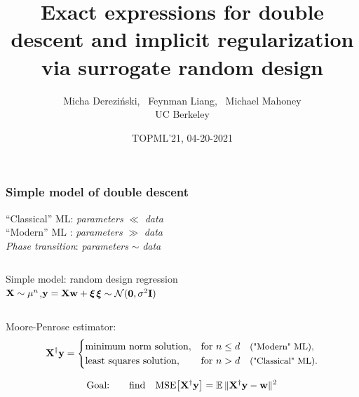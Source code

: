 \documentclass[8pt]{beamer}
\title[Surrogate design]{
  Exact expressions for double descent and implicit regularization via surrogate random design
}
\date{TOPML'21, 04-20-2021}
\author[]{Micha{\polishl } Derezi\'{n}ski, \ Feynman Liang,
  \ Michael Mahoney\\UC Berkeley}
\begin{document}
\begin{frame}
  \maketitle
\end{frame}

\begin{frame}
  \frametitle{Simple model of double descent}

  {\centering
    ``Classical'' ML: \qquad\textit{parameters} $\ll$ \textit{data}\quad~\\
    ``Modern'' ML
    : \qquad\textit{parameters} $\gg$ \textit{data}\quad~\\
    \textit{Phase transition}: \qquad\textit{parameters} $\sim$ \textit{data}\quad~~\\[7mm]
  }
  \begin{columns}
    \begin{column}{0.5\textwidth}
Simple model: random design regression\\[2mm]
$\mathbf X\sim\mu^n$,\quad$\mathbf y=\mathbf X\mathbf w+\boldsymbol\xi$\qquad$\boldsymbol\xi\sim\mathcal{N}(\mathbf 0,\sigma^2\mathbf I)$
    \end{column}
    \begin{column}{0.4\textwidth}
    \end{column}
  \end{columns}
\vspace{5mm}
  
  Moore-Penrose estimator:
  \begin{align*}
    \mathbf X^\dagger\mathbf y =
  \begin{cases}
    \text{minimum norm solution},& \text{for }n\leq d\quad\text{\small("Modern" ML),}\\
    \text{least squares solution},& \text{for }n>d \quad\text{\small("Classical" ML).}
  \end{cases}
  \end{align*}
  
\[\text{Goal:\qquad find}\quad{\mathrm{MSE}\big[\mathbf X^\dagger\mathbf y\big]}=\mathbb E\,\|\mathbf X^\dagger\mathbf y-\mathbf w\|^2\]

\vspace{5mm}

\end{frame}
\end{document}
